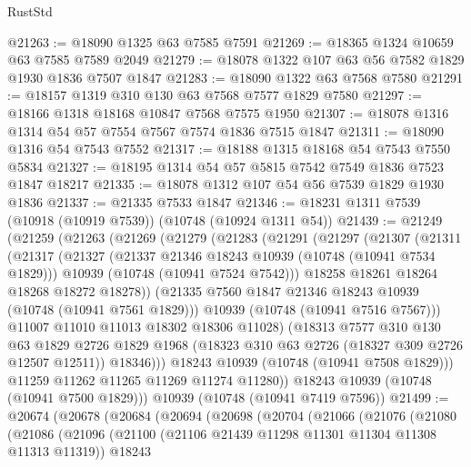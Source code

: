 \begin{lexlean}{RustStd}
\begin{coremodule}
{\begin{coremodule}
{{{{{@21263 := @18090 @1325 @63 @7585 @7591
@21269 := @18365 @1324 @10659 @63 @7585 @7589 @2049
@21279 := @18078 @1322 @107 @63 @56 @7582 @1829 @1930 @1836 @7507 @1847
@21283 := @18090 @1322 @63 @7568 @7580
@21291 := @18157 @1319 @310 @130 @63 @7568 @7577 @1829 @7580
@21297 := @18166 @1318 @18168 @10847 @7568 @7575 @1950
@21307 := @18078 @1316 @1314 @54 @57 @7554 @7567 @7574 @1836 @7515 @1847
@21311 := @18090 @1316 @54 @7543 @7552
@21317 := @18188 @1315 @18168 @54 @7543 @7550 @5834
@21327 := @18195 @1314 @54 @57 @5815 @7542 @7549 @1836 @7523 @1847 @18217
@21335 := @18078 @1312 @107 @54 @56 @7539 @1829 @1930 @1836
@21337 := @21335 @7533 @1847
@21346 := @18231 @1311 @7539 (@10918 (@10919 @7539)) (@10748 (@10924 @1311 @54))
@21439 := @21249
    (@21259
      (@21263
        (@21269
          (@21279
            (@21283
              (@21291
                (@21297
                  (@21307
                    (@21311
                      (@21317
                        (@21327
                          (@21337 @21346 @18243 @10939 (@10748 (@10941 @7534 @1829)))
                          @10939
                          (@10748 (@10941 @7524 @7542)))
                        @18258
                        @18261
                        @18264
                        @18268
                        @18272
                        @18278))
                    (@21335 @7560 @1847 @21346 @18243 @10939 (@10748 (@10941 @7561 @1829)))
                    @10939
                    (@10748 (@10941 @7516 @7567)))
                  @11007
                  @11010
                  @11013
                  @18302
                  @18306
                  @11028)
                (@18313
                  @7577
                  @310
                  @130
                  @63
                  @1829
                  @2726
                  @1829
                  @1968
                  (@18323 @310 @63 @2726 (@18327 @309 @2726 @12507 @12511))
                  @18346)))
            @18243
            @10939
            (@10748 (@10941 @7508 @1829)))
          @11259
          @11262
          @11265
          @11269
          @11274
          @11280))
      @18243
      @10939
      (@10748 (@10941 @7500 @1829)))
    @10939
    (@10748 (@10941 @7419 @7596))
@21499 := @20674
    (@20678
      (@20684
        (@20694
          (@20698
            (@20704
              (@21066
                (@21076
                  (@21080
                    (@21086
                      (@21096
                        (@21100 (@21106 @21439 @11298 @11301 @11304 @11308 @11313 @11319))
                        @18243
}}}}}
\end{coremodule}}
\end{coremodule}
\end{lexlean}

